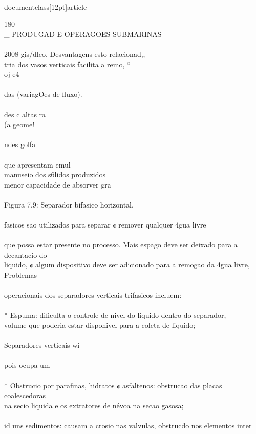 \\documentclass[12pt]{article}
\begin{document}
180 —\\_ PRODUGAD E OPERAGOES SUBMARINAS\\
\\
2008 gis/dleo. Desvantagens esto relacionad,,\\
tria dos vasos verticais facilita a remo, “\\
oj e4\\
\\
das (variagOes de fluxo).\\
\\
des ¢ altas ra\\
(a geome!\\
\\
ndes golfa\\
\\
que apresentam emul\\
manuseio dos s6lidos produzidos\\
menor capacidade de absorver gra\\
\\
Figura 7.9: Separador bifasico horizontal.\\
\\
fasicos sao utilizados para separar ¢ remover qualquer 4gua livre\\
\\
que possa estar presente no processo. Mais espago deve ser deixado para a decantacio do\\
liquido, ¢ algum dispositivo deve ser adicionado para a remogao da 4gua livre, Problemas\\
\\
operacionais dos separadores verticais trifasicos incluem:\\
\\
* Espuma: dificulta o controle de nivel do liquido dentro do separador,\\
volume que poderia estar disponivel para a coleta de liquido;\\
\\
Separadores verticais wi\\
\\
pois ocupa um\\
\\
* Obstrucio por parafinas, hidratos ¢ asfaltenos: obstru¢ao das placas coalescedoras\\
na se¢io liquida e os extratores de névoa na secao gasosa;\\
\\
id uns sedimentos: causam a crosio nas valvulas, obstru¢do nos elementos inter\\
\end{document}
